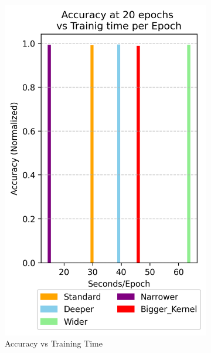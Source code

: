 \documentclass{article}
\begin{document}
\begin{figure}[h!]
\begin{subfigure}[t]{0.3\textwidth}
        \includegraphics[width=\textwidth]{./plots/plot14.png}
        \caption{Accuracy vs Training Time}
        \label{fig:plot16b}
    \end{subfigure}
    \hspace{0.01\textwidth}
    \begin{subfigure}[t]{0.3\textwidth}
        \centering

\end{subfigure}
\end{figure}
\end{document}

